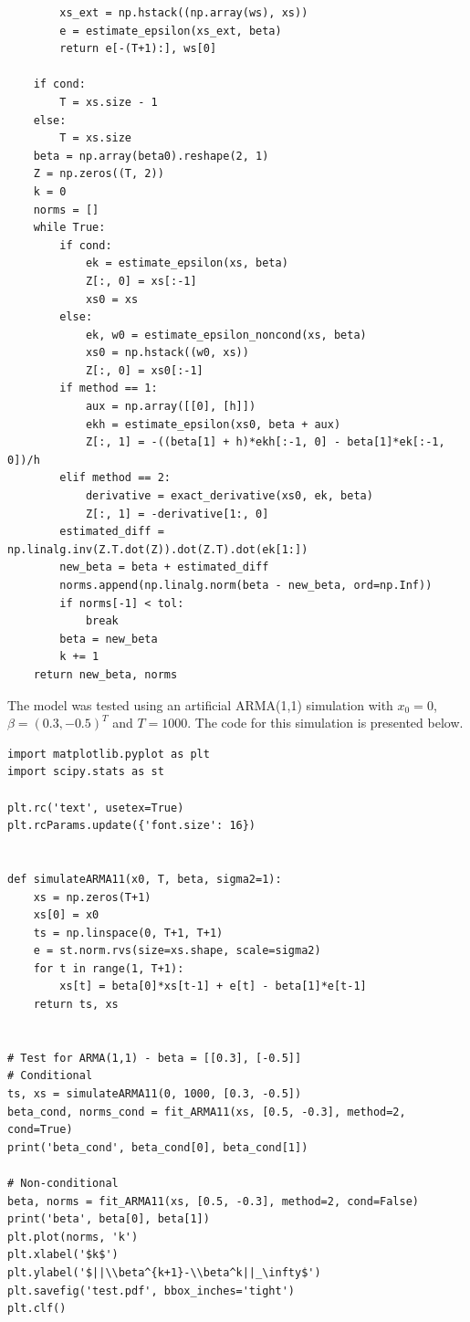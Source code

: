\documentclass[fleqn]{article}
\begin{document}
\begin{enumerate}
\begin{verbatim}
        xs_ext = np.hstack((np.array(ws), xs))
        e = estimate_epsilon(xs_ext, beta)
        return e[-(T+1):], ws[0]

    if cond:
        T = xs.size - 1
    else:
        T = xs.size
    beta = np.array(beta0).reshape(2, 1)
    Z = np.zeros((T, 2))
    k = 0
    norms = []
    while True:
        if cond:
            ek = estimate_epsilon(xs, beta)
            Z[:, 0] = xs[:-1]
            xs0 = xs
        else:
            ek, w0 = estimate_epsilon_noncond(xs, beta)
            xs0 = np.hstack((w0, xs))
            Z[:, 0] = xs0[:-1]
        if method == 1:
            aux = np.array([[0], [h]])
            ekh = estimate_epsilon(xs0, beta + aux)
            Z[:, 1] = -((beta[1] + h)*ekh[:-1, 0] - beta[1]*ek[:-1, 0])/h
        elif method == 2:
            derivative = exact_derivative(xs0, ek, beta)
            Z[:, 1] = -derivative[1:, 0]
        estimated_diff = np.linalg.inv(Z.T.dot(Z)).dot(Z.T).dot(ek[1:])
        new_beta = beta + estimated_diff
        norms.append(np.linalg.norm(beta - new_beta, ord=np.Inf))
        if norms[-1] < tol:
            break
        beta = new_beta
        k += 1
    return new_beta, norms
\end{verbatim}

The model was tested using an artificial ARMA(1,1) simulation with $x_0=0$, $\beta=(0.3, -0.5)^T$ and $T=1000$. The code for this simulation is presented below.
\begin{verbatim}
import matplotlib.pyplot as plt
import scipy.stats as st

plt.rc('text', usetex=True)
plt.rcParams.update({'font.size': 16})


def simulateARMA11(x0, T, beta, sigma2=1):
    xs = np.zeros(T+1)
    xs[0] = x0
    ts = np.linspace(0, T+1, T+1)
    e = st.norm.rvs(size=xs.shape, scale=sigma2)
    for t in range(1, T+1):
        xs[t] = beta[0]*xs[t-1] + e[t] - beta[1]*e[t-1]
    return ts, xs
    

# Test for ARMA(1,1) - beta = [[0.3], [-0.5]]
# Conditional
ts, xs = simulateARMA11(0, 1000, [0.3, -0.5])
beta_cond, norms_cond = fit_ARMA11(xs, [0.5, -0.3], method=2, cond=True)
print('beta_cond', beta_cond[0], beta_cond[1])

# Non-conditional
beta, norms = fit_ARMA11(xs, [0.5, -0.3], method=2, cond=False)
print('beta', beta[0], beta[1])
plt.plot(norms, 'k')
plt.xlabel('$k$')
plt.ylabel('$||\\beta^{k+1}-\\beta^k||_\infty$')
plt.savefig('test.pdf', bbox_inches='tight')
plt.clf()
\end{verbatim}


\end{enumerate}
\end{document}
